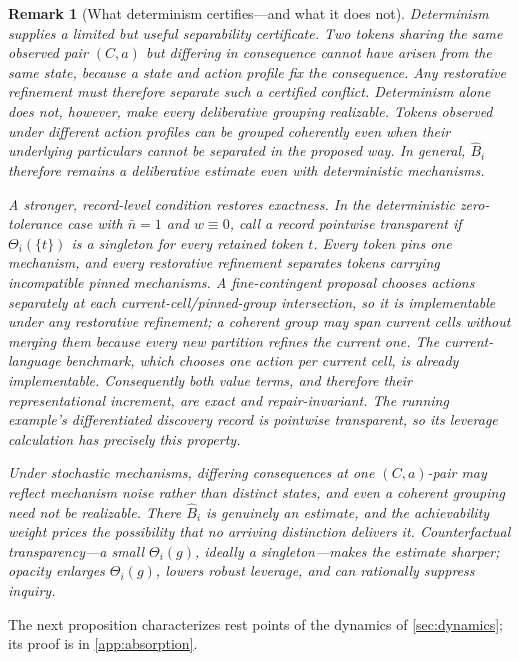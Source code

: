 \documentclass[11pt]{article}
\newtheorem{remark}[assumption]{Remark}
\theoremstyle{definition}
\begin{document}
\begin{remark}[What determinism certifies---and what it does not]
\label{rem:certification}
Determinism supplies a limited but useful separability certificate.
Two tokens sharing the same observed pair $(C,a)$ but differing in consequence cannot have arisen from the same state, because a state and action profile fix the consequence.
Any restorative refinement must therefore separate such a certified conflict.
Determinism alone does not, however, make every deliberative grouping realizable.
Tokens observed under different action profiles can be grouped coherently even when their underlying particulars cannot be separated in the proposed way.
In general, $\widehat B_i$ therefore remains a deliberative estimate even with deterministic mechanisms.

A stronger, record-level condition restores exactness.
In the deterministic zero-tolerance case with $\bar n=1$ and $w\equiv0$, call a record \emph{pointwise transparent} if $\Theta_i(\{t\})$ is a singleton for every retained token $t$.
Every token pins one mechanism, and every restorative refinement separates tokens carrying incompatible pinned mechanisms.
A fine-contingent proposal chooses actions separately at each current-cell/pinned-group intersection, so it is implementable under any restorative refinement; a coherent group may span current cells without merging them because every new partition refines the current one.
The current-language benchmark, which chooses one action per current cell, is already implementable.
Consequently both value terms, and therefore their representational increment, are exact and repair-invariant.
The running example's differentiated discovery record is pointwise transparent, so its leverage calculation has precisely this property.

Under stochastic mechanisms, differing consequences at one $(C,a)$-pair may reflect mechanism noise rather than distinct states, and even a coherent grouping need not be realizable.
There $\widehat B_i$ is genuinely an estimate, and the achievability weight prices the possibility that no arriving distinction delivers it.
Counterfactual transparency---a small $\Theta_i(g)$, ideally a singleton---makes the estimate sharper; opacity enlarges $\Theta_i(g)$, lowers robust leverage, and can rationally suppress inquiry.
\end{remark}

The next proposition characterizes rest points of the dynamics of \cref{sec:dynamics}; its proof is in \cref{app:absorption}.
\end{document}
